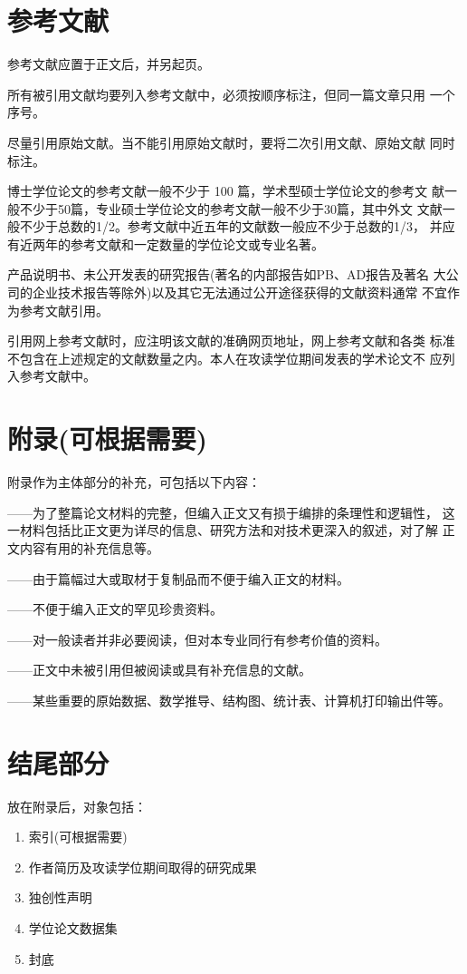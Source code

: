 \section{参考文献}
参考文献应置于正文后，并另起页。 

所有被引用文献均要列入参考文献中，必须按顺序标注，但同一篇文章只用
一个序号。 

尽量引用原始文献。当不能引用原始文献时，要将二次引用文献、原始文献
同时标注。 

博士学位论文的参考文献一般不少于 100 篇，学术型硕士学位论文的参考文
献一般不少于50篇，专业硕士学位论文的参考文献一般不少于30篇，其中外文
文献一般不少于总数的1/2。参考文献中近五年的文献数一般应不少于总数的1/3，
并应有近两年的参考文献和一定数量的学位论文或专业名著。 

产品说明书、未公开发表的研究报告(著名的内部报告如PB、AD报告及著名
大公司的企业技术报告等除外)以及其它无法通过公开途径获得的文献资料通常
不宜作为参考文献引用。 

引用网上参考文献时，应注明该文献的准确网页地址，网上参考文献和各类
标准不包含在上述规定的文献数量之内。本人在攻读学位期间发表的学术论文不
应列入参考文献中。

\section{附录(可根据需要)}
附录作为主体部分的补充，可包括以下内容： 

——为了整篇论文材料的完整，但编入正文又有损于编排的条理性和逻辑性，
这一材料包括比正文更为详尽的信息、研究方法和对技术更深入的叙述，对了解
正文内容有用的补充信息等。 

——由于篇幅过大或取材于复制品而不便于编入正文的材料。

——不便于编入正文的罕见珍贵资料。 

——对一般读者并非必要阅读，但对本专业同行有参考价值的资料。 

——正文中未被引用但被阅读或具有补充信息的文献。 

——某些重要的原始数据、数学推导、结构图、统计表、计算机打印输出件等。 

\section{结尾部分}
放在附录后，对象包括：
\begin{enumerate}[itemsep=0pt,topsep=2pt,parsep=0pt]
  \item {索引(可根据需要)}
  \item {作者简历及攻读学位期间取得的研究成果} 
  \item {独创性声明} 
  \item {学位论文数据集} 
  \item {封底}
\end{enumerate}

